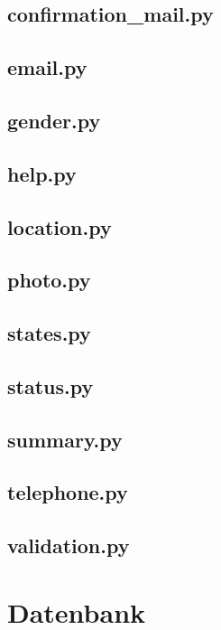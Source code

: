 \subsection{confirmation_mail.py}

\subsection{email.py}

\subsection{gender.py}

\subsection{help.py}

\subsection{location.py}

\subsection{photo.py}

\subsection{states.py}

\subsection{status.py}

\subsection{summary.py}

\subsection{telephone.py}

\subsection{validation.py}




\section{Datenbank}


